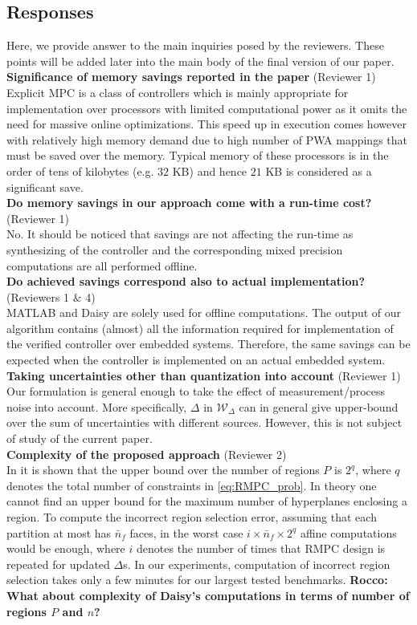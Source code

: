 {\subsection{Responses}
Here, we provide answer to the main inquiries posed by the reviewers. These points will be added later into the main body of the final version of our paper.\\
\textbf{Significance of memory savings reported in the paper} (Reviewer 1)\\
Explicit MPC is a class of controllers which is mainly appropriate for implementation over processors with limited computational power as it omits the need for massive online optimizations. This speed up in execution comes however with relatively high memory demand due to high number of PWA mappings that must be saved over the memory. Typical memory of these processors is in the order of tens of kilobytes (e.g. $32$ KB) and hence $21$ KB is considered as a significant save.\\ 
\textbf{Do memory savings in our approach come with a run-time cost?} (Reviewer 1)
\\
No. It should be noticed that savings are not affecting the run-time as synthesizing of the controller and the corresponding mixed precision computations are all performed offline.\\
\textbf{Do achieved savings correspond also to actual implementation?} (Reviewers 1 $\&$ 4)\\
MATLAB and Daisy are solely used for offline computations. The output of our algorithm contains (almost) all the information required for implementation of the verified controller over embedded systems. Therefore, the same savings can be expected when the controller is implemented on an actual embedded system.\\
\textbf{Taking uncertainties other than quantization into account} (Reviewer 1)\\
Our formulation is general enough to take the effect of measurement/process noise into account. More specifically, $\Delta$ in $\mathcal{W}_{\Delta}$ can in general give upper-bound over the sum of uncertainties with different sources. However, this is not subject of study of the current paper.\\
\textbf{Complexity of the proposed approach} (Reviewer 2)\\
In \cite{Alessio2009} it is shown that the upper bound over the number of regions $P$ is $2^q$, where $q$ denotes the total number of constraints in \autoref{eq:RMPC_prob}. In theory one cannot find an upper bound for the maximum number of hyperplanes enclosing a region. To compute the incorrect region selection error, assuming that each partition at most has $\bar n_f$ faces, in the worst case $i\times\bar n_f\times 2^q$ affine computations would be enough, where $i$ denotes the number of times that RMPC design is repeated for updated $\Delta$s. In our experiments, computation of incorrect region selection takes only a few minutes for our largest tested benchmarks. \textbf{Rocco: What about complexity of Daisy's computations in terms of number of regions $P$ and $n$?}\\
}
